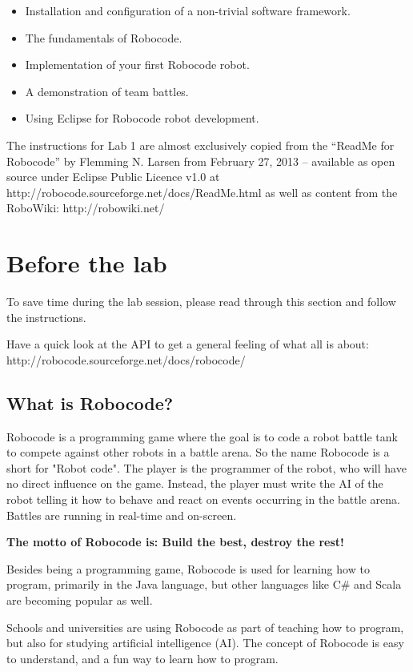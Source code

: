 \documentclass{scrreprt}
\begin{document}
\begin{itemize}
\item Installation and configuration of a non-trivial software framework.
\item The fundamentals of Robocode.
\item Implementation of your first Robocode robot.
\item A demonstration of team battles. 
\item Using Eclipse for Robocode robot development.
\end{itemize}

The instructions for Lab 1 are almost exclusively copied from the ``ReadMe for Robocode'' by Flemming N. Larsen from February 27, 2013 -- available as open source under Eclipse Public Licence v1.0 at http://robocode.sourceforge.net/docs/ReadMe.html as well as content from the RoboWiki: http://robowiki.net/

\chapter{Before the lab}
To save time during the lab session, please read through this section and follow the instructions.

Have a quick look at the API to get a general feeling of what all is about:\\ 
http://robocode.sourceforge.net/docs/robocode/

\section{What is Robocode?}
Robocode is a programming game where the goal is to code a robot battle tank to compete against other robots in a battle arena. So the name Robocode is a short for "Robot code". The player is the programmer of the robot, who will have no direct influence on the game. Instead, the player must write the AI of the robot telling it how to behave and react on events occurring in the battle arena. Battles are running in real-time and on-screen.

\begin{center}
\textbf{The motto of Robocode is: Build the best, destroy the rest!}
\end{center}

Besides being a programming game, Robocode is used for learning how to program, primarily in the Java language, but other languages like C\# and Scala are becoming popular as well.

Schools and universities are using Robocode as part of teaching how to program, but also for studying artificial intelligence (AI). The concept of Robocode is easy to understand, and a fun way to learn how to program.
\end{document}
